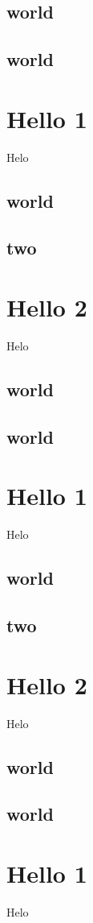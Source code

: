 \documentclass[10pt]{book}
\begin{document}
\section{world }
\section{world }\chapter{Hello 1}
Helo
\section{world }
\section{two}

\chapter{Hello 2}
Helo
\section{world }
\section{world }\chapter{Hello 1}
Helo
\section{world }
\section{two}

\chapter{Hello 2}
Helo
\section{world }
\section{world }\chapter{Hello 1}
Helo
\end{document}
